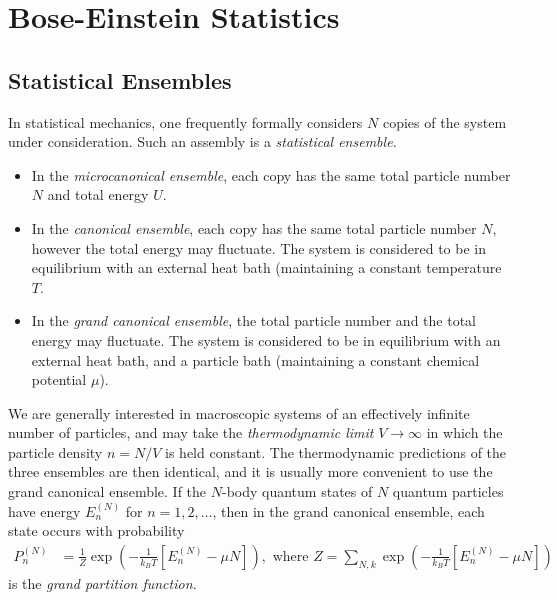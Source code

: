 \documentclass[a4paper, 11pt, normalem]{report}
\begin{document}
\chapter{Bose-Einstein Statistics}
\section{Statistical Ensembles}
In statistical mechanics, one frequently formally considers $N$ copies of the system under consideration.
Such an assembly is a \emph{statistical ensemble.}
\begin{itemize}
    \item In the \emph{microcanonical ensemble}, each copy has the same total particle number $N$ and total energy $U$.
    \item In the \emph{canonical ensemble}, each copy has the same total particle number $N$, however the total energy may fluctuate.
        The system is considered to be in equilibrium with an external heat bath (maintaining a constant temperature $T$.
    \item In the \emph{grand canonical ensemble}, the total particle number and the total energy may fluctuate.
        The system is considered to be in equilibrium with an external heat bath, and a particle bath (maintaining a constant chemical potential $\mu$).
\end{itemize}
We are generally interested in macroscopic systems of an effectively infinite number of particles, and may take the \emph{thermodynamic limit} $V\to\infty$ in which the particle density $n=N/V$ is held constant.
The thermodynamic predictions of the three ensembles are then identical, and it is usually more convenient to use the grand canonical ensemble.
If the $N$-body quantum states of $N$ quantum particles have energy $E_n^{(N)}$ for $n=1,2,\dots$, then in the grand canonical ensemble, each state occurs with probability
\begin{align}
    P_n^{(N)} &= \frac{1}{Z}\exp\left(-\frac{1}{k_BT}\left[E_n^{(N)}-\mu N\right]\right),
    \text{ where } Z = \sum_{N,k} \exp\left(-\frac{1}{k_BT}\left[E_n^{(N)}-\mu N\right]\right)
\end{align}
is the \emph{grand partition function.}
\end{document}
